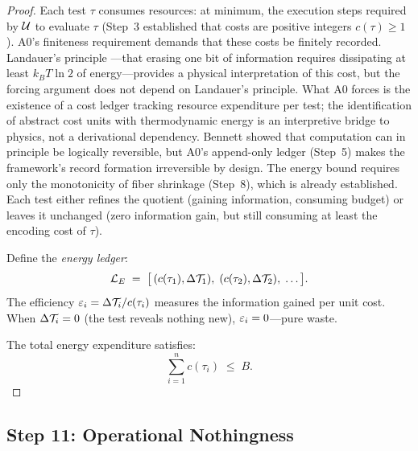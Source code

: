 \begin{proof}
Each test $\tau$ consumes resources: at minimum, the execution steps
required by $\mathcal{U}$ to evaluate $\tau$ (Step~3 established that costs are
positive integers $c(\tau) \geq 1$).  A0's finiteness requirement demands
that these costs be finitely recorded.  Landauer's principle
\citep{landauer1961}---that erasing one bit of information requires
dissipating at least $k_B T \ln 2$ of energy---provides a physical
interpretation of this cost, but the forcing argument does not depend on
Landauer's principle.  What A0 forces is the existence of a cost ledger
tracking resource expenditure per test; the identification of abstract cost
units with thermodynamic energy is an interpretive bridge to physics, not a
derivational dependency.  Bennett \citep{bennett1973} showed that
computation can in principle be logically reversible, but A0's append-only
ledger (Step~5) makes the framework's record formation irreversible by
design.  The energy bound requires only the monotonicity of fiber shrinkage
(Step~8), which is already established.  Each test either refines the
quotient (gaining information, consuming budget) or leaves it unchanged
(zero information gain, but still consuming at least the encoding cost of
$\tau$).

Define the \emph{energy ledger}:
\[
  \mathcal{L}_E \;=\; \bigl[\, (c(\tau_1), \Delta\mathcal{T}_1),\;
    (c(\tau_2), \Delta\mathcal{T}_2),\; \ldots \,\bigr].
\]
The efficiency $\varepsilon_i = \Delta\mathcal{T}_i / c(\tau_i)$ measures the
information gained per unit cost.  When $\Delta\mathcal{T}_i = 0$ (the test reveals
nothing new), $\varepsilon_i = 0$---pure waste.

The total energy expenditure satisfies:
\[
  \sum_{i=1}^{n} c(\tau_i) \;\leq\; B.
\]

\end{proof}


\subsection{Step 11: Operational Nothingness}\label{app:step11}

